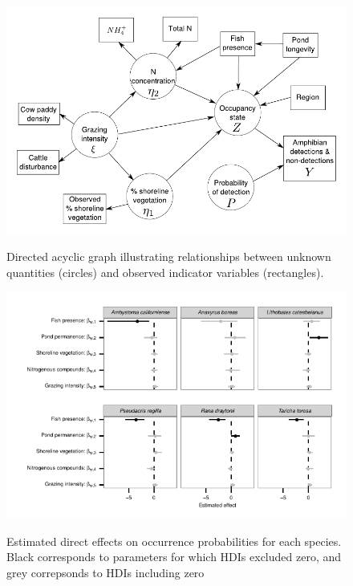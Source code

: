 \begin{figure}[htbp]
\caption[DAG relating latent and observed variables.]{
Directed acyclic graph illustrating relationships between unknown
quantities (circles) and observed indicator variables (rectangles).
}
\centering
\includegraphics[width=150mm]{figs/ch3/fig2.pdf}
\label{3-2}
\end{figure}

\begin{figure}[htbp]
\caption[Direct effects on amphibian occurrence]{
Estimated direct effects on occurrence probabilities for each species.
Black corresponds to parameters for which HDIs excluded zero, and grey
correpsonds to HDIs including zero
}
\centering
\includegraphics[width=150mm]{figs/ch3/fig3.pdf}
\label{3-3}
\end{figure}

